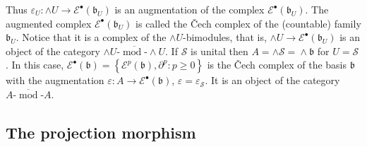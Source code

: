\documentclass[12pt]{amsart}%
\theoremstyle{plain}
\numberwithin{equation}{section}
\numberwithin{equation}{section}
\numberwithin{theorem}{section}
\numberwithin{lemma}{section}
\numberwithin{remark}{section}
\numberwithin{example}{section}
\numberwithin{proposition}{section}
\numberwithin{definition}{section}
\numberwithin{corollary}{section}
\begin{document}
Thus $\varepsilon_{U}:\wedge U\rightarrow\mathcal{E}^{\bullet}\left(
\mathfrak{b}_{U}\right)  $ is an augmentation of the complex $\mathcal{E}%
^{\bullet}\left(  \mathfrak{b}_{U}\right)  $. The augmented complex
$\mathcal{E}^{\bullet}\left(  \mathfrak{b}_{U}\right)  $ is called the
\v{C}ech complex of the (countable) family $\mathfrak{b}_{U}$. Notice that it
is a complex of the $\wedge U$-bimodules, that is, $\wedge U\rightarrow
\mathcal{E}^{\bullet}\left(  \mathfrak{b}_{U}\right)  $ is an object of the
category $\overline{\wedge U\text{-}\operatorname*{mod}\text{-}\wedge U}$. If
$\mathcal{S}$ is unital then $A=\wedge\mathcal{S=}\wedge\mathfrak{b}$ for
$U=\mathcal{S}$. In this case, $\mathcal{E}^{\bullet}\left(  \mathfrak{b}%
\right)  =\left\{  \mathcal{E}^{p}\left(  \mathfrak{b}\right)  ,\partial
^{p}:p\geq0\right\}  $ is the \v{C}ech complex of the basis $\mathfrak{b}$
with the augmentation $\varepsilon:A\rightarrow\mathcal{E}^{\bullet}\left(
\mathfrak{b}\right)  $, $\varepsilon=\varepsilon_{\mathcal{S}}$. It is an
object of the category $\overline{A\text{-}\operatorname*{mod}\text{-}A}$.

\subsection{The projection morphism}
\end{document}
